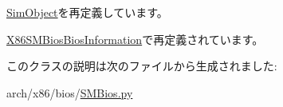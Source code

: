 \hyperlink{classm5_1_1SimObject_1_1SimObject_acce15679d830831b0bbe8ebc2a60b2ca}{SimObject}を再定義しています。

\hyperlink{classSMBios_1_1X86SMBiosBiosInformation_acce15679d830831b0bbe8ebc2a60b2ca}{X86SMBiosBiosInformation}で再定義されています。

このクラスの説明は次のファイルから生成されました:\begin{DoxyCompactItemize}
\item 
arch/x86/bios/\hyperlink{SMBios_8py}{SMBios.py}\end{DoxyCompactItemize}
